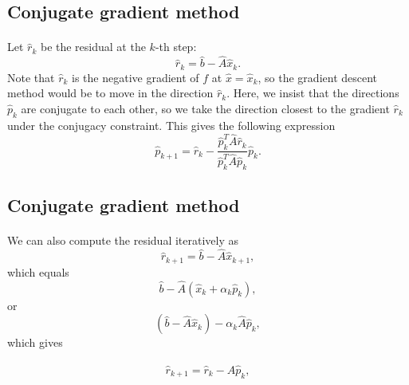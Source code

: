\documentclass[%
oneside,                 %
final,                   %
10pt]{article}
\begin{document}
\subsection{Conjugate gradient method}

\paragraph{}
Let  $\hat{r}_k$ be the residual at the $k$-th step:
\begin{equation*}
\hat{r}_k=\hat{b}-\hat{A}\hat{x}_k.
\end{equation*}
Note that $\hat{r}_k$ is the negative gradient of $f$ at 
$\hat{x}=\hat{x}_k$, 
so the gradient descent method would be to move in the direction $\hat{r}_k$. 
Here, we insist that the directions $\hat{p}_k$ are conjugate to each other, 
so we take the direction closest to the gradient $\hat{r}_k$  
under the conjugacy constraint. 
This gives the following expression
\begin{equation*}
\hat{p}_{k+1}=\hat{r}_k-\frac{\hat{p}_k^T \hat{A}\hat{r}_k}{\hat{p}_k^T\hat{A}\hat{p}_k} \hat{p}_k.
\end{equation*}



\subsection{Conjugate gradient method}

\paragraph{}
We can also  compute the residual iteratively as
\begin{equation*}
\hat{r}_{k+1}=\hat{b}-\hat{A}\hat{x}_{k+1},
 \end{equation*}
which equals
\begin{equation*}
\hat{b}-\hat{A}(\hat{x}_k+\alpha_k\hat{p}_k),
 \end{equation*}
or
\begin{equation*}
(\hat{b}-\hat{A}\hat{x}_k)-\alpha_k\hat{A}\hat{p}_k,
 \end{equation*}
which gives

\begin{equation*}
\hat{r}_{k+1}=\hat{r}_k-\hat{A}\hat{p}_{k},
 \end{equation*}
\end{document}
